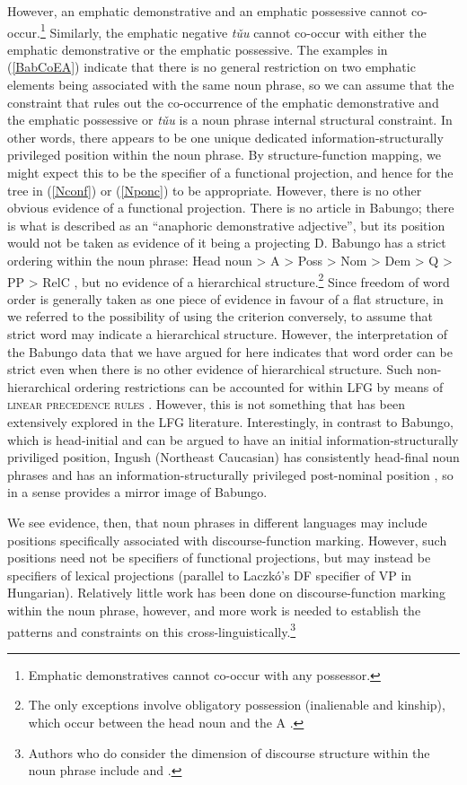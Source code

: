 \documentclass[output=paper,hidelinks]{langscibook}
\begin{document}
However, an emphatic demonstrative and an emphatic possessive cannot co-occur.\footnote{Emphatic demonstratives cannot co-occur with any possessor.} Similarly, the emphatic negative \emph{t\v{u}u} cannot co-occur with either the emphatic demonstrative or the emphatic possessive. The examples in (\ref{BabCoEA}) indicate that there is no general restriction on two emphatic elements being associated with the same noun phrase, so we can assume that the constraint that rules out the co-occurrence of the emphatic demonstrative and the emphatic possessive or \emph{t\v{u}u} is a noun phrase internal structural constraint. In other words, there appears to be one unique dedicated information-structurally privileged position within the noun phrase. By structure-function mapping, we might expect this to be the specifier of a functional projection, and hence for the tree in (\ref{Nconf}) or (\ref{Nponc}) to be appropriate. However, there is no other obvious evidence of a functional projection. There is no article in Babungo; there is what is described as an ``anaphoric demonstrative adjective''\citep[97]{Schaub85}, but its position would not be taken as evidence of it being a projecting D. Babungo has a strict ordering within the noun phrase: Head noun > A > Poss > Nom > Dem > Q > PP > RelC \citep[77]{Schaub85}, but no evidence of a hierarchical structure.\footnote{The only exceptions involve obligatory possession (inalienable and kinship), which occur between the head noun and the A .} Since freedom of word order is generally taken as one piece of evidence in favour of a flat structure, in  we referred to the possibility of using the criterion conversely, to assume that strict word may indicate a hierarchical structure. However, the interpretation of the Babungo data that we have argued for here indicates that word order can be strict even when there is no other evidence of hierarchical structure. Such non-hierarchical ordering restrictions can be accounted for within LFG by means of \textsc{linear precedence rules} \citep[144--145]{DLM:LFG}. However, this is not something that has been extensively explored in the LFG literature. Interestingly, in contrast to Babungo, which is head-initial and can be argued to have an initial information-structurally priviliged position, Ingush (Northeast Caucasian) has consistently head-final noun phrases and has an information-structurally privileged post-nominal position \citep{Nichols11}, so in a sense provides a mirror image of Babungo. 

We see evidence, then, that noun phrases in different languages may include positions specifically associated with discourse-function marking. However, such positions need not be specifiers of functional projections, but may instead be specifiers of lexical projections (parallel to Laczk\'o's DF specifier of VP in Hungarian). Relatively little work has been done on discourse-function marking within the noun phrase, however, and more work is needed to establish the patterns and constraints on this cross-linguistically.\footnote{Authors who do consider the dimension of discourse structure within the noun phrase include \citet{Charters14} and \citet{ChisaPayn01,ChisaPayn03}.}
\end{document}

